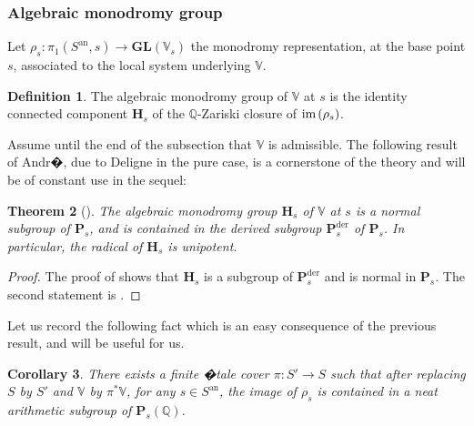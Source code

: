 \documentclass[10pt]{article}
\numberwithin{equation}{subsection}
\theoremstyle{plain}
\newtheorem{theorem}{Theorem}[section]
\newtheorem{corollary}[theorem]{Corollary}
\theoremstyle{definition}
\newtheorem{definition}[theorem]{Definition}
\theoremstyle{remark}
\newcommand{\Q}{\mathbb Q}
\newcommand{\V}{\mathbb V}
\newcommand{\pp}{\mathbf P}
\newcommand{\mon}{\mathbf H}
\newcommand{\im}{\mathrm{im} \hspace{0.05cm}}
\newcommand{\an}{\mathrm{an}}
\newcommand{\gl}{\mathbf{GL}}
\newcommand{\der}{\mathrm{der}}
\begin{document}
\subsubsection*{Algebraic monodromy group}
Let $\rho_s : \pi_1(S^\an,s) \rightarrow \gl(\V_s)$ the monodromy representation, at the base point $s$, associated to the local system underlying $\V$.
\begin{definition}
The algebraic monodromy group of $\V$ at $s$ is the identity connected component $\mon_s$ of the $\Q$-Zariski closure of $\im(\rho_s)$.
\end{definition}
Assume until the end of the subsection that $\V$ is admissible. The following result of Andr�, due to Deligne in the pure case, is a cornerstone of the theory and will be of constant use in the sequel:
\begin{theorem}[\cite{andre}]\label{andre}
The algebraic monodromy group $\mon_s$ of $\V$ at $s$ is a normal subgroup of $\pp_s$, and is contained in the derived subgroup $\pp_s^\der$ of $\pp_s$. In particular, the radical of $\mon_s$ is unipotent.
\end{theorem}
\begin{proof}
The proof of \cite[Thm. 1]{andre} shows that $\mon_s$ is a subgroup of $\pp_s^\der$ and is normal in $\pp_s$. The second statement is \cite[Cor. 2]{andre}.
\end{proof}
Let us record the following fact which is an easy consequence of the previous result, and will be useful for us.
\begin{corollary}\label{neatetal}
There exists a finite �tale cover $\pi : S'\rightarrow S$ such that after replacing $S$ by $S'$ and $\V$ by $\pi^\ast \V$, for any $s \in S^\an$, the image of $\rho_{s}$ is contained in a neat arithmetic subgroup of $\pp_{s}(\Q)$.
\end{corollary}
\end{document}
